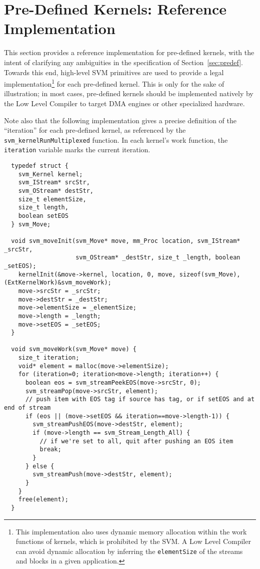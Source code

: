\clearpage
\section{Pre-Defined Kernels:  Reference Implementation}  %
\label{sec:referenceimpl}

This section provides a reference implementation for pre-defined
kernels, with the intent of clarifying any ambiguities in the
specification of Section~\ref{sec:predef}.  Towards this end,
high-level SVM primitives are used to provide a legal
implementation\footnote{This implementation also uses dynamic memory
allocation within the work functions of kernels, which is prohibited
by the SVM.  A Low Level Compiler can avoid dynamic allocation by
inferring the {\tt elementSize} of the streams and blocks in a given
application.} for each pre-defined kernel.  This is only for the sake
of illustration; in most cases, pre-defined kernels should be
implemented natively by the Low Level Compiler to target DMA engines
or other specialized hardware.

Note also that the following implementation gives a precise definition
of the ``iteration'' for each pre-defined kernel, as referenced by the
{\tt svm\_kernelRunMultiplexed} function.  In each kernel's work
function, the {\tt iteration} variable marks the current iteration.

\makeline
{}
{\small
\begin{verbatim}
  typedef struct {
    svm_Kernel kernel;
    svm_IStream* srcStr,
    svm_OStream* destStr,
    size_t elementSize,
    size_t length,
    boolean setEOS
  } svm_Move;

  void svm_moveInit(svm_Move* move, mm_Proc location, svm_IStream* _srcStr, 
                    svm_OStream* _destStr, size_t _length, boolean _setEOS);
    kernelInit(&move->kernel, location, 0, move, sizeof(svm_Move), (ExtKernelWork)&svm_moveWork);
    move->srcStr = _srcStr;
    move->destStr = _destStr;
    move->elementSize = _elementSize;
    move->length = _length;
    move->setEOS = _setEOS;
  }

  void svm_moveWork(svm_Move* move) {
    size_t iteration;
    void* element = malloc(move->elementSize);
    for (iteration=0; iteration<move->length; iteration++) {
      boolean eos = svm_streamPeekEOS(move->srcStr, 0);
      svm_streamPop(move->srcStr, element);
      // push item with EOS tag if source has tag, or if setEOS and at end of stream
      if (eos || (move->setEOS && iteration==move->length-1)) {
        svm_streamPushEOS(move->destStr, element);
        if (move->length == svm_Stream_Length_All) {
          // if we're set to all, quit after pushing an EOS item
          break;
        }
      } else {
        svm_streamPush(move->destStr, element);
      }
    }
    free(element);
  }
\end{verbatim}}

